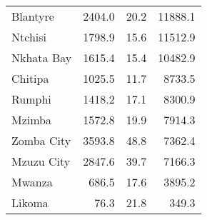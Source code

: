 \begin{tabular}{lrrr}
Blantyre      &      2404.0 &         20.2 &          11888.1 \\
Ntchisi       &      1798.9 &         15.6 &          11512.9 \\
Nkhata Bay    &      1615.4 &         15.4 &          10482.9 \\
Chitipa       &      1025.5 &         11.7 &           8733.5 \\
Rumphi        &      1418.2 &         17.1 &           8300.9 \\
Mzimba        &      1572.8 &         19.9 &           7914.3 \\
Zomba City    &      3593.8 &         48.8 &           7362.4 \\
Mzuzu City    &      2847.6 &         39.7 &           7166.3 \\
Mwanza        &       686.5 &         17.6 &           3895.2 \\
Likoma        &        76.3 &         21.8 &            349.3 \\
\bottomrule
\end{tabular}
